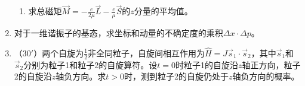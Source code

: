 \begin{enumerate}
\begin{enumerate}
\item 
求总磁矩$\vec{M}=-\frac{e}{2\mu}\vec{L}-\frac{e}{\mu}\vec{S}$的$z$分量的平均值。
	
\end{enumerate}

\banswer{
	
}

\newpage
\item 
对于一维谐振子的基态，求坐标和动量的不确定度的乘积$\Delta x\cdot\Delta p$。

\banswer{
	
}


\item 
（$30'$）两个自旋为$\frac{1}{2}$非全同粒子，自旋间相互作用为$\hat{H}=J\vec{s}_1\cdot\vec{s}_2$，其中$\vec{s}_1$和$\vec{s}_2$分别为粒子1和粒子2的自旋算符。设$t=0$时粒子1的自旋沿$z$轴正方向，粒子2的自旋沿$z$轴负方向。求$t>0$时，测到粒子2的自旋仍处于$z$轴负方向的概率。


\banswer{
	
}


	
\end{enumerate}
